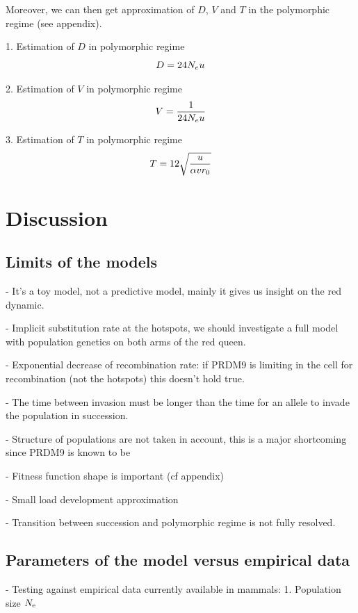 \documentclass{article}
\begin{document}
Moreover, we can then get approximation of $D$, $V$ and $T$ in the polymorphic regime (see appendix).

1. Estimation of $D$ in polymorphic regime
\begin{equation}
  D = 24 N_e u
\end{equation}

2. Estimation of $V$ in polymorphic regime
\begin{equation}
  V = \dfrac{1}{24 N_e u}
\end{equation}

3. Estimation of $ T $ in polymorphic regime
\begin{equation}
   T =  12 \sqrt{\dfrac{ u }{\alpha v r_0}}
\end{equation}

\section*{Discussion}

\subsection*{Limits of the models}

- It's a toy model, not a predictive model, mainly it gives us insight on the red dynamic.

- Implicit substitution rate at the hotspots, we should investigate a full model with population genetics on both arms of the red queen.

- Exponential decrease of recombination rate: if PRDM9 is limiting in the cell for recombination (not the hotspots) this doesn't hold true.

- The time between invasion must be longer than the time for an allele to invade the population in succession. 

- Structure of populations are not taken in account, this is a major shortcoming since PRDM9 is known to be 

- Fitness function shape is important (cf appendix)

- Small load development approximation

- Transition between succession and polymorphic regime is not fully resolved.



\subsection*{Parameters of the model versus empirical data}
- Testing against empirical data currently available in mammals: 
1. Population size $N_\mathrm{e}$
\end{document}
